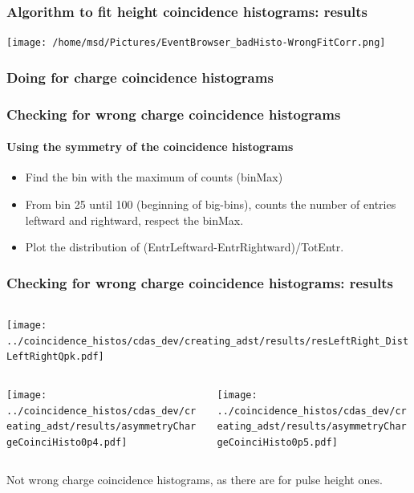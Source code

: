 \documentclass[aspectratio=169]{beamer}
\begin{document}
\begin{frame}
  \frametitle{Algorithm to fit height coincidence histograms:
  results}
  \begin{center}
    \texttt{[image: /home/msd/Pictures/EventBrowser\_badHisto-WrongFitCorr.png]}
  \end{center}
\end{frame}



\begin{frame}
  \frametitle{Doing for charge coincidence histograms}
\end{frame}

\begin{frame}
  \frametitle{Checking for wrong charge coincidence histograms}
  \framesubtitle{Using the symmetry of the coincidence histograms}
  \vspace{0.5cm}

  \begin{itemize}
    \item Find the bin with the maximum of counts (binMax)
    \item From bin 25 until 100 (beginning of big-bins), counts the number of
      entries leftward and rightward, respect the binMax.
    \item Plot the distribution of
      (EntrLeftward-EntrRightward)/TotEntr.
  \end{itemize}
\end{frame}


\begin{frame}
  \frametitle{Checking for wrong charge coincidence histograms:
  results}
  
  \begin{columns}
    \centering
    \begin{column}{0.5\textwidth}
      \texttt{[image: ../coincidence\_histos/cdas\_dev/creating\_adst/results/resLeftRight\_DistLeftRightQpk.pdf]}
    \end{column}
  \end{columns}
  \begin{columns}
    \centering
    \begin{column}{0.5\textwidth}
      \texttt{[image: ../coincidence\_histos/cdas\_dev/creating\_adst/results/asymmetryChargeCoinciHisto0p4.pdf]}
    \end{column}
    \begin{column}{0.5\textwidth}
      \texttt{[image: ../coincidence\_histos/cdas\_dev/creating\_adst/results/asymmetryChargeCoinciHisto0p5.pdf]}
    \end{column}
  \end{columns}
  \vspace{0.5cm}

  Not wrong charge coincidence histograms, as there are for
  pulse height ones.
\end{frame}
\end{document}
